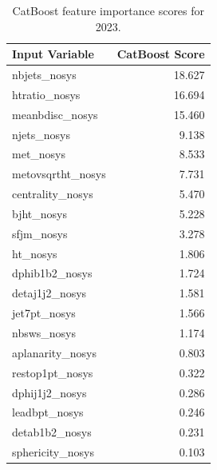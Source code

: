 \documentclass[twoside]{article}
\begin{document}
\begin{table}[htbp]
\centering
\begin{tabular}{l r}
\hline
\textbf{Input Variable} & \textbf{CatBoost Score} \\
\hline
nbjets\_nosys        & 18.627 \\
htratio\_nosys       & 16.694 \\
meanbdisc\_nosys     & 15.460 \\
njets\_nosys         & 9.138  \\
met\_nosys           & 8.533  \\
metovsqrtht\_nosys   & 7.731  \\
centrality\_nosys    & 5.470  \\
bjht\_nosys          & 5.228  \\
sfjm\_nosys          & 3.278  \\
ht\_nosys            & 1.806  \\
dphib1b2\_nosys      & 1.724  \\
detaj1j2\_nosys      & 1.581  \\
jet7pt\_nosys        & 1.566  \\
nbsws\_nosys         & 1.174  \\
aplanarity\_nosys    & 0.803  \\
restop1pt\_nosys     & 0.322  \\
dphij1j2\_nosys      & 0.286  \\
leadbpt\_nosys       & 0.246  \\
detab1b2\_nosys      & 0.231  \\
sphericity\_nosys    & 0.103  \\
\hline
\end{tabular}
\caption{CatBoost feature importance scores for 2023.}
\label{tab:catboost_scores_2023}
\end{table}
\end{document}
